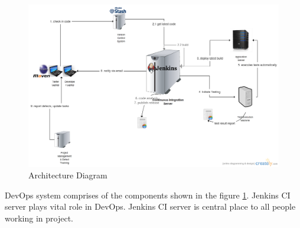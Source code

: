 \documentclass[a4paper,oneside,1,english1pt]{report}
\begin{document}
\begin{figure}[h]
	\includegraphics[width=\linewidth]{diagrams/Arch diagram.png}
	\caption{Architecture Diagram}
	\label{fig:arch_dia}
\end{figure}
DevOps system comprises of the components shown in the figure \ref{fig:arch_dia}.
Jenkins \ac{CI} server plays vital role in DevOps. Jenkins \ac{CI} server is central place to all people working in project.\\
\end{document}
